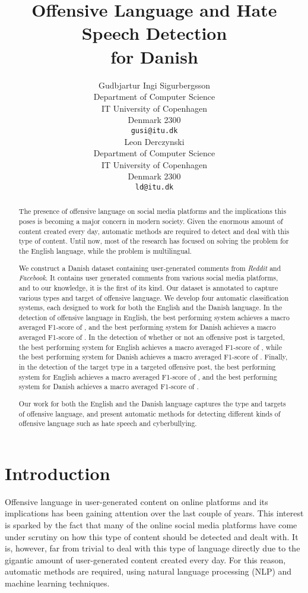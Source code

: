 \documentclass{article}
\title{Offensive Language and Hate Speech Detection \\ for Danish}
\author{
  Gudbjartur Ingi Sigurbergsson\\
  Department of Computer Science\\
  IT University of Copenhagen\\
  Denmark 2300 \\
  \texttt{gusi@itu.dk} \\
\And
  Leon Derczynski\\
  Department of Computer Science\\
  IT University of Copenhagen\\
  Denmark 2300 \\
  \texttt{ld@itu.dk} \\
}
\begin{document}
\maketitle

\begin{abstract}
The presence of offensive language on social media platforms and the implications this poses is becoming a major concern in modern society. Given the enormous amount of content created every day, automatic methods are required to detect and deal with this type of content. Until now, most of the research has focused on solving the problem for the English language, while the problem is multilingual. 



We construct a Danish dataset containing user-generated comments from \textit{Reddit} and \textit{Facebook}.
It contains user generated comments from various social media platforms, and to our knowledge, it is the first of its kind.
Our dataset is annotated to capture various types and target of offensive language.
We develop four automatic classification systems, each designed to work for both the English and the Danish language. In the detection of offensive language in English, the best performing system achieves a macro averaged F1-score of , and the best performing system for Danish achieves a macro averaged F1-score of . In the detection of whether or not an offensive post is targeted, the best performing system for English achieves a macro averaged F1-score of , while the best performing system for Danish achieves a macro averaged F1-score of . Finally, in the detection of the target type in a targeted offensive post, the best performing system for English achieves a macro averaged F1-score of , and the best performing system for Danish achieves a macro averaged F1-score of .

Our work for both the English and the Danish language captures the type and targets of offensive language, and present automatic methods for detecting different kinds of offensive language such as hate speech and cyberbullying. 

\end{abstract}




\section{Introduction}
\label{ch:intro}
Offensive language in user-generated content on online platforms and its implications has been gaining attention over the last couple of years. This interest is sparked by the fact that many of the online social media platforms have come under scrutiny on how this type of content should be detected and dealt with. It is, however, far from trivial to deal with this type of language directly due to the gigantic amount of user-generated content created every day. For this reason, automatic methods are required, using natural language processing (NLP) and machine learning techniques.
\end{document}
